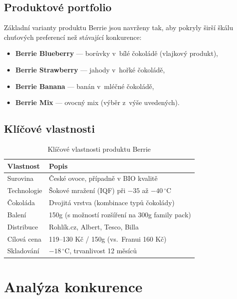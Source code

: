 \subsection{Produktové portfolio}

Základní varianty produktu Berrie jsou navrženy tak, aby pokryly širší škálu chuťových preferencí než stávající konkurence:
\begin{itemize}
  \item \textbf{Berrie Blueberry} — borůvky v~bílé čokoládě (vlajkový produkt),
  \item \textbf{Berrie Strawberry} — jahody v~hořké čokoládě,
  \item \textbf{Berrie Banana} — banán v~mléčné čokoládě,
  \item \textbf{Berrie Mix} — ovocný mix (výběr z~výše uvedených).
\end{itemize}

\subsection{Klíčové vlastnosti}

\begin{table}[H]
\centering
\caption{Klíčové vlastnosti produktu Berrie}
\label{tab:product_features}
\begin{tabularx}{\textwidth}{lX}
\toprule
\textbf{Vlastnost} & \textbf{Popis} \\
\midrule
Surovina & České ovoce, případně v BIO kvalitě \\
Technologie & Šokové mražení (IQF) při $-35$ až $-40\,^{\circ}\mathrm{C}$ \\
Čokoláda & Dvojitá vrstva (kombinace typů čokolády) \\
Balení & 150g (s možností rozšíření na 300g family pack) \\
Distribuce & Rohlík.cz, Albert, Tesco, Billa \\
Cílová cena & 119--130 Kč / 150g (vs.\ Franui 160 Kč) \\
Skladování & $-18\,^{\circ}\mathrm{C}$, trvanlivost 12 měsíců \\
\bottomrule
\end{tabularx}
\end{table}

\section{Analýza konkurence}
\label{sec:res_competition}

